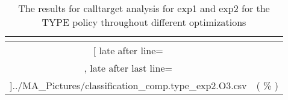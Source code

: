 \begin{table}[!htbp]
{\begin{tabular}{|c|c}
\multicolumn{1}{c}{}
	\\\midrule
	\csvreader[ late after line=\\, late after last line=\\\bottomrule]{../MA_Pictures/classification_comp.type_exp2.O3.csv}{
}
	{\csvcolxiii ( \csvcolxiv \% ) & \csvcolxv ( \csvcolxvi \% )}%


    	\end{tabular}
}
		\caption {The results for calltarget analysis for exp1 and exp2 for the TYPE policy throughout different optimizations}
		\label{tbl:CTdestinterexp12TYPE}
\end{table}


